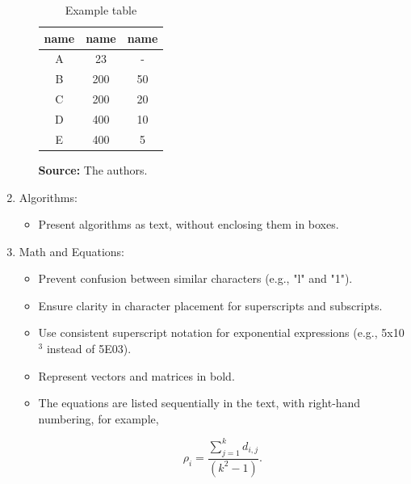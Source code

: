 \documentclass[twoside, 11pt]{article}
\begin{document}
\begin{enumerate}
\begin{itemize}
         \begin{table}[!htpp]
    \caption{Example table}
	\label{tab01}
	\renewcommand{\arraystretch}{1.2}
	\begin{center}
    \begin{tabular}{ccc}
    \hline
    \textbf{name } &	\textbf{name  }	& \textbf{name }\\
    \hline		
    A	&23	&- \\
    B	&200	&50\\
    C	&200	&20\\
    D	&400	&10\\
    E	&400	&5\\
    \hline
    \end{tabular}
    \end{center}
    \begin{center}
        \small\textbf{Source:} The authors.
    \end{center}
\end{table}
      \end{itemize}
      

    \vspace{1cm}
   \item Algorithms:
      \begin{itemize}
         \item Present algorithms as text, without enclosing them in boxes.
      \end{itemize}

   \item Math and Equations:
      \begin{itemize}
         \item Prevent confusion between similar characters (e.g., "l" and "1").
         \item Ensure clarity in character placement for superscripts and subscripts.
         \item Use consistent superscript notation for exponential expressions (e.g., 5x10$^3$ instead of 5E03).
         \item Represent vectors and matrices in bold.
         \item The equations are listed sequentially in the text, with right-hand numbering, for example,

\begin{equation}
\label{eq1}
\rho_i=\frac{\sum^{k}_{j=1} d_{i,j}}{(k^2-1)}.
\end{equation}


\end{itemize}
\end{enumerate}
\end{document}
